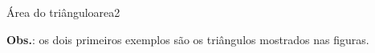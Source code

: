 \documentclass[12pt,a4paper,oneside]{article}
\begin{document}
\begin{problem}{Área do triângulo}{area}{2}
\begin{example}
%
\end{example}


\begin{example}
%
\end{example}


\begin{example}
%
\end{example}

\textbf{Obs.}: os dois primeiros exemplos são os triângulos mostrados nas figuras.


\end{problem}
\end{document}
